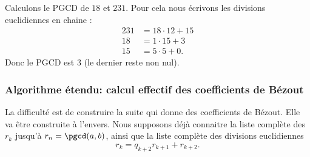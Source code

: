 \begin{example}
	Calculons le PGCD de \( 18\) et \( 231\). Pour cela nous écrivons les divisions euclidiennes en chaine :
	\begin{subequations}
		\begin{align}
			231 & = 18 \cdot 12 + 15 \\
			18  & =  1 \cdot 15 + 3  \\
			15  & =  5 \cdot 5  + 0.
		\end{align}
	\end{subequations}
	Donc le PGCD est \( 3\) (le dernier reste non nul).
\end{example}

\subsubsection{Algorithme étendu: calcul effectif des coefficients de Bézout}
\label{SUBSECooRHSQooEuBWbd}

La difficulté est de construire la suite qui donne des coefficients de Bézout. Elle va être construite à l'envers. Nous supposons déjà connaitre la liste complète des \( r_k\) jusqu'à \( r_n=\pgcd(a,b)\), ainsi que la liste complète des divisions euclidiennes
\begin{equation}
	r_k=q_{k+2}r_{k+1}+r_{k+2}.
\end{equation}


